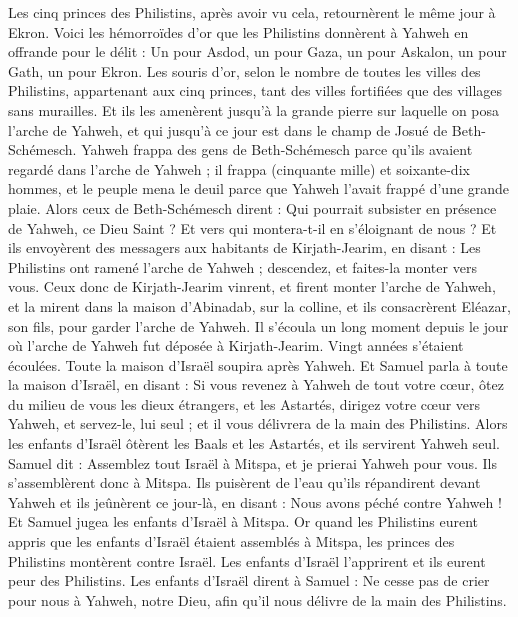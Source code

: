 \begin{multicols}{2}
Les cinq princes des Philistins, après avoir vu cela, retournèrent le même jour à Ekron.
Voici les hémorroïdes d'or que les Philistins donnèrent à Yahweh en offrande pour le délit : Un pour Asdod, un pour Gaza, un pour Askalon, un pour Gath, un pour Ekron.
Les souris d'or, selon le nombre de toutes les villes des Philistins, appartenant aux cinq princes, tant des villes fortifiées que des villages sans murailles. Et ils les amenèrent jusqu'à la grande pierre sur laquelle on posa l'arche de Yahweh, et qui jusqu'à ce jour est dans le champ de Josué de Beth-Schémesch.
Yahweh frappa des gens de Beth-Schémesch parce qu'ils avaient regardé dans l'arche de Yahweh ; il frappa (cinquante mille) et soixante-dix hommes, et le peuple mena le deuil parce que Yahweh l'avait frappé d'une grande plaie.
Alors ceux de Beth-Schémesch dirent : Qui pourrait subsister en présence de Yahweh, ce Dieu Saint ? Et vers qui montera-t-il en s'éloignant de nous ?
Et ils envoyèrent des messagers aux habitants de Kirjath-Jearim, en disant : Les Philistins ont ramené l'arche de Yahweh ; descendez, et faites-la monter vers vous.
\VerseOne{}Ceux donc de Kirjath-Jearim vinrent, et firent monter l'arche de Yahweh, et la mirent dans la maison d'Abinadab, sur la colline, et ils consacrèrent Eléazar, son fils, pour garder l'arche de Yahweh.
Il s'écoula un long moment depuis le jour où l'arche de Yahweh fut déposée à Kirjath-Jearim. Vingt années s'étaient écoulées. Toute la maison d'Israël soupira après Yahweh.
Et Samuel parla à toute la maison d'Israël, en disant : Si vous revenez à Yahweh de tout votre cœur, ôtez du milieu de vous les dieux étrangers, et les Astartés, dirigez votre cœur vers Yahweh, et servez-le, lui seul ; et il vous délivrera de la main des Philistins.
Alors les enfants d'Israël ôtèrent les Baals et les Astartés, et ils servirent Yahweh seul.
Samuel dit : Assemblez tout Israël à Mitspa, et je prierai Yahweh pour vous.
Ils s'assemblèrent donc à Mitspa. Ils puisèrent de l'eau qu'ils répandirent devant Yahweh et ils jeûnèrent ce jour-là, en disant : Nous avons péché contre Yahweh ! Et Samuel jugea les enfants d'Israël à Mitspa.
Or quand les Philistins eurent appris que les enfants d'Israël étaient assemblés à Mitspa, les princes des Philistins montèrent contre Israël. Les enfants d'Israël l'apprirent et ils eurent peur des Philistins.
Les enfants d'Israël dirent à Samuel : Ne cesse pas de crier pour nous à Yahweh, notre Dieu, afin qu'il nous délivre de la main des Philistins.

\end{multicols}
